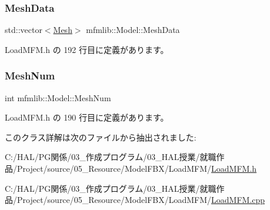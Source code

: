 \subsubsection{\texorpdfstring{Mesh\+Data}{MeshData}}
{\footnotesize\ttfamily std\+::vector$<$\mbox{\hyperlink{classmfmlib_1_1_mesh}{Mesh}}$>$ mfmlib\+::\+Model\+::\+Mesh\+Data}



 Load\+M\+F\+M.\+h の 192 行目に定義があります。

\mbox{\label{classmfmlib_1_1_model_ab810627ca36c30ef29d787ca5b81d7ba}} 
\subsubsection{\texorpdfstring{Mesh\+Num}{MeshNum}}
{\footnotesize\ttfamily int mfmlib\+::\+Model\+::\+Mesh\+Num}



 Load\+M\+F\+M.\+h の 190 行目に定義があります。



このクラス詳解は次のファイルから抽出されました\+:\begin{DoxyCompactItemize}
\item 
C\+:/\+H\+A\+L/\+P\+G関係/03\+\_\+作成プログラム/03\+\_\+\+H\+A\+L授業/就職作品/\+Project/source/05\+\_\+\+Resource/\+Model\+F\+B\+X/\+Load\+M\+F\+M/\mbox{\hyperlink{_load_m_f_m_8h}{Load\+M\+F\+M.\+h}}\item 
C\+:/\+H\+A\+L/\+P\+G関係/03\+\_\+作成プログラム/03\+\_\+\+H\+A\+L授業/就職作品/\+Project/source/05\+\_\+\+Resource/\+Model\+F\+B\+X/\+Load\+M\+F\+M/\mbox{\hyperlink{_load_m_f_m_8cpp}{Load\+M\+F\+M.\+cpp}}\end{DoxyCompactItemize}
